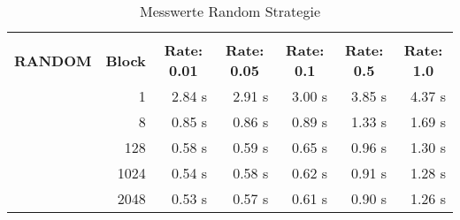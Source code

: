 \begin{table}[!htb]

\begin{tabular}{rrrrrrr}
\hline\\
\multicolumn{0}{c}{\colorbox{myblue}{\textbf{RANDOM}}} &  
\multicolumn{0}{c}{\colorbox{myblue}{\textbf{Block}}} &  
\multicolumn{0}{c}{\colorbox{myblue}{\textbf{Rate: 0.01}}} &  
\multicolumn{0}{c}{\colorbox{myblue}{\textbf{Rate: 0.05}}} & 
\multicolumn{0}{c}{\colorbox{myblue}{\textbf{Rate: 0.1}}} &
\multicolumn{0}{c}{\colorbox{myblue}{\textbf{Rate: 0.5}}} & 
\multicolumn{0}{c}{\colorbox{myblue}{\textbf{Rate: 1.0}}}\\
 & 1 & 2.84 s & 2.91 s & 3.00 s & 3.85 s & 4.37 s \\
 & 8 & 0.85 s & 0.86 s & 0.89 s & 1.33 s & 1.69 s \\
 & 128 & 0.58 s & 0.59 s & 0.65 s & 0.96 s & 1.30 s \\ 
 & 1024 & 0.54 s & 0.58 s & 0.62 s & 0.91 s & 1.28 s \\
 & 2048 & 0.53 s & 0.57 s & 0.61 s & 0.90 s & 1.26 s \\
\hline
\end{tabular}
\caption{Messwerte Random Strategie}
\label{tblRandom}
\end{table}
